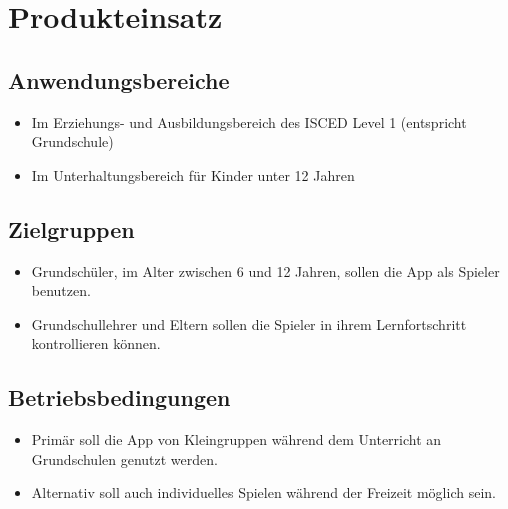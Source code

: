 \section{Produkteinsatz}

\subsection{Anwendungsbereiche}
\begin{itemize}
	\item Im Erziehungs- und Ausbildungsbereich des ISCED Level 1 (entspricht Grundschule)
	\item Im Unterhaltungsbereich für Kinder unter 12 Jahren
\end{itemize}


\subsection{Zielgruppen}

\begin{itemize}
	\item Grundschüler, im Alter zwischen 6 und 12 Jahren, sollen die App als Spieler benutzen.
	\item Grundschullehrer und Eltern sollen die Spieler in ihrem Lernfortschritt kontrollieren können.
\end{itemize}

\subsection{Betriebsbedingungen}
\begin{itemize}
	\item Primär soll die App von Kleingruppen während dem Unterricht an Grundschulen genutzt werden.
	\item Alternativ soll auch individuelles Spielen während der Freizeit möglich sein.
\end{itemize}
